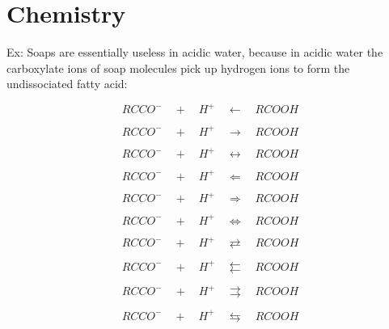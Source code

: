 \documentclass{article}
\begin{document}
\section{Chemistry}

Ex:
Soaps are essentially useless in acidic water, because in acidic water the carboxylate
ions of soap molecules pick up hydrogen ions to form the undissociated fatty acid:

$$RCCO^- \quad + \quad H^+ \quad\longleftarrow\quad RCOOH$$

$$RCCO^- \quad + \quad H^+ \quad\longrightarrow\quad RCOOH$$

$$RCCO^- \quad + \quad H^+ \quad\longleftrightarrow\quad RCOOH$$

$$RCCO^- \quad + \quad H^+ \quad\Longleftarrow\quad RCOOH$$

$$RCCO^- \quad + \quad H^+ \quad\Longrightarrow\quad RCOOH$$

$$RCCO^- \quad + \quad H^+ \quad\Longleftrightarrow\quad RCOOH$$

$$RCCO^- \quad + \quad H^+ \quad\rightleftarrows\quad RCOOH$$

$$RCCO^- \quad + \quad H^+ \quad\leftleftarrows\quad RCOOH$$

$$RCCO^- \quad + \quad H^+ \quad\rightrightarrows\quad RCOOH$$

$$RCCO^- \quad + \quad H^+ \quad\leftrightarrows\quad RCOOH$$
\end{document}
